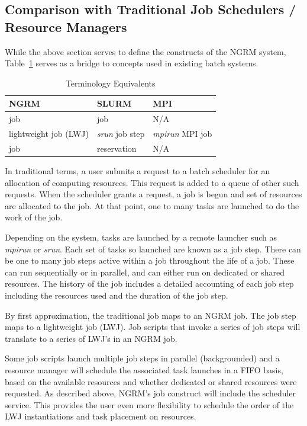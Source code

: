 \documentclass{article}
\begin{document}
\subsection{Comparison with Traditional Job Schedulers / Resource Managers}

While the above section serves to define the constructs of the NGRM
system, Table~\ref{tab:tradterms} serves as a bridge to concepts used
in existing batch systems.

\begin{table}
\caption{Terminology Equivalents}
\centering
\begin{tabular}{|l|l|l|}
\hline
NGRM & SLURM & MPI \\
\hline
job & job & N/A\\
lightweight job (LWJ) & {\em srun} job step & {\em mpirun} MPI job\\
job & reservation & N/A \\
\hline
\end{tabular}
\label{tab:tradterms}
\end{table}

In traditional terms, a user submits a request to a batch scheduler
for an allocation of computing resources.  This request is added to a
queue of other such requests.  When the scheduler grants a request, a
job is begun and set of resources are allocated to the job.  At that
point, one to many tasks are launched to do the work of the job.

Depending on the system, tasks are launched by a remote launcher such
as {\em mpirun} or {\em srun}.  Each set of tasks so launched are
known as a job step.  There can be one to many job steps active within
a job throughout the life of a job.  These can run sequentially or in
parallel, and can either run on dedicated or shared resources.  The
history of the job includes a detailed accounting of each job step
including the resources used and the duration of the job step.

By first approximation, the traditional job maps to an NGRM job.  The
job step maps to a lightweight job (LWJ).  Job scripts that invoke a
series of job steps will translate to a series of LWJ's in an NGRM
job.

Some job scripts launch multiple job steps in parallel (backgrounded)
and a resource manager will schedule the associated task launches in a
FIFO basis, based on the available resources and whether dedicated or
shared resources were requested.  As described above, NGRM's job
construct will include the scheduler service.  This provides the user
even more flexibility to schedule the order of the LWJ instantiations
and task placement on resources.
\end{document}
